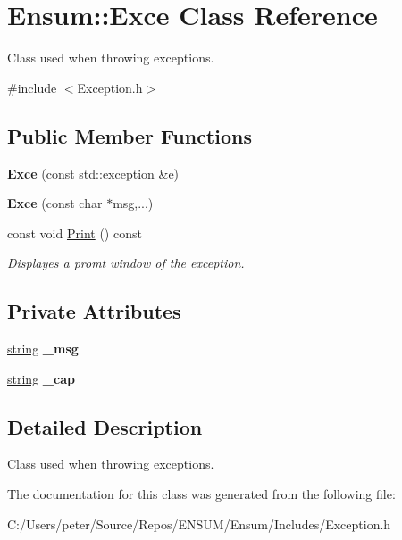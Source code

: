 \hypertarget{class_ensum_1_1_exce}{}\section{Ensum\+:\+:Exce Class Reference}
\label{class_ensum_1_1_exce}


Class used when throwing exceptions.  




{\ttfamily \#include $<$Exception.\+h$>$}

\subsection*{Public Member Functions}
\begin{DoxyCompactItemize}
\item 
{\bfseries Exce} (const std\+::exception \&e)\hypertarget{class_ensum_1_1_exce_aac9da3566349e2b459a0180dd30dc678}{}\label{class_ensum_1_1_exce_aac9da3566349e2b459a0180dd30dc678}

\item 
{\bfseries Exce} (const char $\ast$msg,...)\hypertarget{class_ensum_1_1_exce_a041cfe2bc0b98817568d9defb37bd98a}{}\label{class_ensum_1_1_exce_a041cfe2bc0b98817568d9defb37bd98a}

\item 
const void \hyperlink{class_ensum_1_1_exce_a0ae40fb8875bbc48afeedac6ba8a8804}{Print} () const \hypertarget{class_ensum_1_1_exce_a0ae40fb8875bbc48afeedac6ba8a8804}{}\label{class_ensum_1_1_exce_a0ae40fb8875bbc48afeedac6ba8a8804}

\begin{DoxyCompactList}\small\item\em Displayes a promt window of the exception. \end{DoxyCompactList}\end{DoxyCompactItemize}
\subsection*{Private Attributes}
\begin{DoxyCompactItemize}
\item 
\hyperlink{class_ensum_1_1string}{string} {\bfseries \+\_\+msg}\hypertarget{class_ensum_1_1_exce_accefd5af2666c691ad2b4a682ff59057}{}\label{class_ensum_1_1_exce_accefd5af2666c691ad2b4a682ff59057}

\item 
\hyperlink{class_ensum_1_1string}{string} {\bfseries \+\_\+cap}\hypertarget{class_ensum_1_1_exce_a9af3c82ac2580a4f72d342e7d359dadd}{}\label{class_ensum_1_1_exce_a9af3c82ac2580a4f72d342e7d359dadd}

\end{DoxyCompactItemize}


\subsection{Detailed Description}
Class used when throwing exceptions. 

The documentation for this class was generated from the following file\+:\begin{DoxyCompactItemize}
\item 
C\+:/\+Users/peter/\+Source/\+Repos/\+E\+N\+S\+U\+M/\+Ensum/\+Includes/Exception.\+h\end{DoxyCompactItemize}
